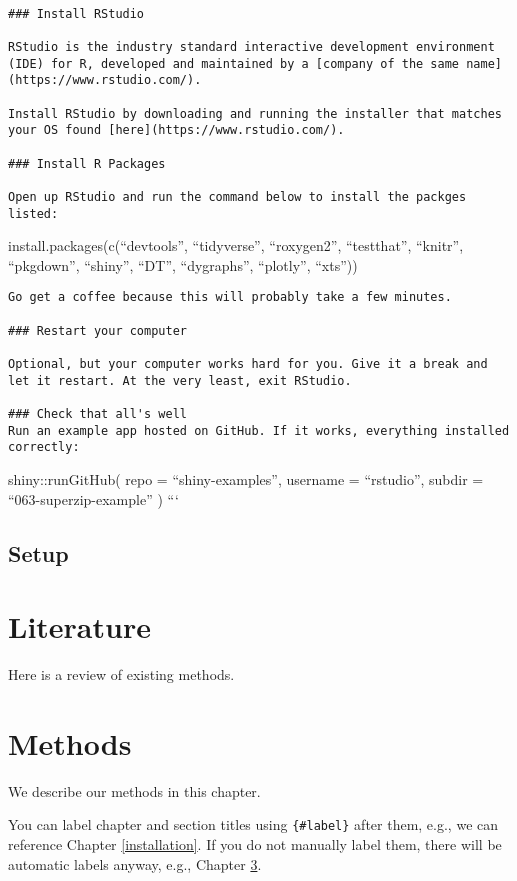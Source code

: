 \documentclass[]{book}
\begin{document}
\begin{verbatim}

### Install RStudio

RStudio is the industry standard interactive development environment (IDE) for R, developed and maintained by a [company of the same name](https://www.rstudio.com/).

Install RStudio by downloading and running the installer that matches your OS found [here](https://www.rstudio.com/).

### Install R Packages

Open up RStudio and run the command below to install the packges listed:
\end{verbatim}

install.packages(c(``devtools'', ``tidyverse'', ``roxygen2'',
``testthat'', ``knitr'', ``pkgdown'', ``shiny'', ``DT'', ``dygraphs'',
``plotly'', ``xts''))

\begin{verbatim}
Go get a coffee because this will probably take a few minutes.

### Restart your computer

Optional, but your computer works hard for you. Give it a break and let it restart. At the very least, exit RStudio.

### Check that all's well
Run an example app hosted on GitHub. If it works, everything installed correctly:
\end{verbatim}

shiny::runGitHub( repo = ``shiny-examples'', username = ``rstudio'',
subdir = ``063-superzip-example'' ) ```

\section{Setup}\label{setup}

\chapter{Literature}\label{literature}

Here is a review of existing methods.

\chapter{Methods}\label{methods}

We describe our methods in this chapter.

You can label chapter and section titles using \texttt{\{\#label\}}
after them, e.g., we can reference Chapter \ref{installation}. If you do
not manually label them, there will be automatic labels anyway, e.g.,
Chapter \ref{methods}.
\end{document}
